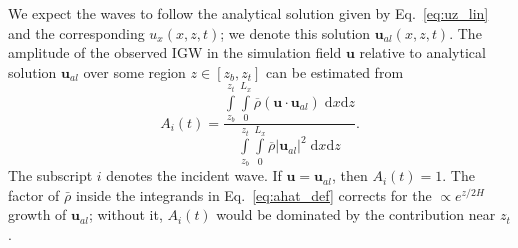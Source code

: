 \documentclass[
        fleqn,
        usenatbib,
    ]{mnras}
\newcommand*{\abs}[1]{\left|#1\right|}
\newcommand*{\p}[1]{\left(#1\right)}
\newcommand*{\bm}[1]{\mathbf{#1}}
\begin{document}
We expect the waves to follow the analytical solution given by
Eq.~\eqref{eq:uz_lin} and the corresponding $u_x(x, z, t)$; we denote this
solution $\bm{u}_{al}(x, z, t)$. The amplitude of the observed IGW in the
simulation field $\bm{u}$ relative to analytical solution $\bm{u}_{al}$ over
some region $z \in [z_b, z_t]$ can be estimated from
\begin{equation}
    A_i(t) = \frac{\int\limits_{z_b}^{z_t}\int\limits_0^{L_x}
        \overline{\rho}\p{\bm{u} \cdot \bm{u}_{al}}\;\mathrm{d}x\mathrm{d}z}
        {\int\limits_{z_b}^{z_t}\int\limits_0^{L_x}
        \overline{\rho}\abs{\bm{u}_{al}}^2\;\mathrm{d}x\mathrm{d}z}.
        \label{eq:ahat_def}
\end{equation}
The subscript $i$ denotes the incident wave. If $\bm{u} = \bm{u}_{al}$, then
$A_i(t) = 1$. \textcolor{Corr}{The factor of $\bar{\rho}$ inside the integrands
in Eq.~\eqref{eq:ahat_def} corrects for the $\propto e^{z/2H}$ growth of
$\bm{u}_{al}$; without it, $A_i(t)$ would be dominated by the contribution near
$z_t$.}
\end{document}
